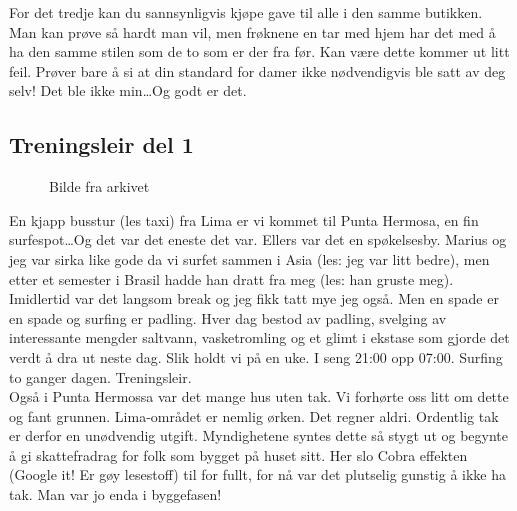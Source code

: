 For det tredje kan du sannsynligvis kjøpe gave til alle i den samme
butikken. Man kan prøve så hardt man vil, men frøknene en tar med hjem
har det med å ha den samme stilen som de to som er der fra før. Kan
være dette kommer ut litt feil. Prøver bare å si at din standard for
damer
ikke nødvendigvis ble satt av deg selv! Det ble ikke min\ldots Og godt er det.\\

\subsection*{Treningsleir del 1}


\begin{figure}[H]
	\centering
	\noindent{}
	\caption{Bilde fra arkivet}
\label{fig:takeropskrytt}
\end{figure}
En kjapp busstur (les taxi) fra Lima er vi kommet til Punta Hermosa,
en fin surfespot\ldots Og det var det eneste det var. Ellers var det en
spøkelsesby. Marius og jeg var sirka like gode da vi
surfet sammen i Asia (les: jeg var litt bedre), men etter et semester i Brasil hadde han dratt
fra meg (les: han gruste meg). Imidlertid var det langsom break og jeg fikk tatt
mye jeg også. Men en spade er en spade og surfing er padling. Hver dag
bestod av padling,
svelging av interessante mengder saltvann, vasketromling og et glimt
i ekstase som gjorde det verdt å dra ut neste dag. Slik holdt vi på en
uke. I seng 21:00 opp 07:00. Surfing to ganger dagen. Treningsleir.\\



Også i Punta Hermossa var det mange hus uten tak. Vi forhørte oss litt
om dette og fant grunnen. Lima-området er nemlig ørken. Det regner
aldri. Ordentlig tak er derfor en unødvendig utgift. Myndighetene
syntes dette så stygt ut og begynte å gi skattefradrag for folk som
bygget på huset sitt. Her slo Cobra effekten (Google it!
Er gøy lesestoff) til for fullt, for nå var det plutselig gunstig å ikke
ha tak. Man var jo enda i byggefasen!


